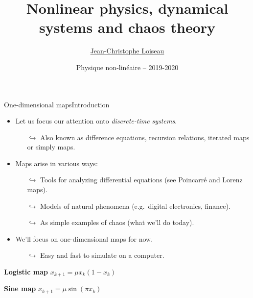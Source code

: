 \documentclass[usenames,dvipsnames,svgnames,10pt,aspectratio=169]{beamer}
\title[Nonlinear physics] %
{
	Nonlinear physics, dynamical \\
	systems and chaos theory
}
\author[J.-Ch.~Loiseau] %
{
	\underline{Jean-Christophe Loiseau}
}
\institute[unused]
{
	\url{jean-christophe.loiseau@ensam.eu} \\
	Laboratoire DynFluid \\
	Arts et M\'etiers, France.
}
\date[unused]{Physique non-lin\'eaire -- 2019-2020}
\begin{document}
\titleframe	%


\begin{frame}[t, c]{One-dimensional maps}{Introduction}
	\begin{minipage}{.58\textwidth}
		\begin{itemize}
			\item Let us focus our attention onto \emph{discrete-time systems}.
			\begin{itemize}
				\item[\( \hookrightarrow \)] Also known as difference equations, recursion relations, iterated maps or simply maps.
			\end{itemize}

			\medskip

			\item Maps arise in various ways:
			\begin{itemize}
				\item[\( \hookrightarrow \)] Tools for analyzing differential equations (see Poincarré and Lorenz maps).
				\item[\( \hookrightarrow \)] Models of natural phenomena (e.g.\ digital electronics, finance).
				\item[\( \hookrightarrow \)] As simple examples of chaos (what we'll do today).
			\end{itemize}

			\medskip

			\item We'll focus on one-dimensional maps for now.
			\begin{itemize}
				\item[\( \hookrightarrow \)] Easy and fast to simulate on a computer.
			\end{itemize}
		\end{itemize}
	\end{minipage}%
	\hfill
	\begin{minipage}{.38\textwidth}
		\centering
		\begin{block}{\centering \textbf{Logistic map}}
			\centering
			\( x_{k+1} = \mu x_k \left( 1 - x_k \right) \)
		\end{block}

		\begin{block}{\centering \textbf{Sine map}}
			\centering
			\( x_{k+1} = \mu \sin \left( \pi x_k \right) \)
		\end{block}


\end{minipage}
\end{frame}
\end{document}
